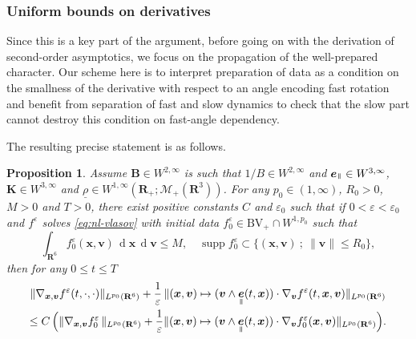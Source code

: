 \documentclass[JEP,XML,SOM,Unicode]{cedram}
\let\mathcal\mathscr
\newcommand{\sep}{\ ;\ }
\newcommand{\BV}{\mathrm{BV}}
\let\eps\varepsilon
\DeclareMathOperator\dD{d}\let\dd\dD
\theoremstyle{plain}
\newtheorem{proposition}[theorem]{Proposition}
\theoremstyle{definition}
\newcommand{\bpr}{\begin{proposition}}
\newcommand{\epr}{\end{proposition}}
\newcommand\R{\mathbf R}
\newcommand\bB{{\boldsymbol B}}
\newcommand\bK{{\boldsymbol K}}
\newcommand\bfv{{\boldsymbol v}}
\newcommand\bfx{{\boldsymbol x}}
\newcommand\urho{{\underline \rho}}
\newcommand\cM{{\mathcal M}}
\DeclareMathOperator{\beD}{\boldsymbol{e}}
\newcommand\eDpar{\beD_\mypar}
\newcommand{\mypar}{{\mkern3mu\vphantom{\perp}\vrule depth 0pt\mkern2mu\vrule depth 0pt\mkern3mu}}
\begin{document}
\subsubsection{Uniform bounds on derivatives}

Since this is a key part of the argument, before going on with the derivation of second-order asymptotics, we focus on the propagation of the well-prepared character. Our scheme here is to interpret preparation of data as a condition on the smallness of the derivative with respect to an angle encoding fast rotation and benefit from separation of fast and slow dynamics to check that the slow part cannot destroy this condition on fast-angle dependency.

The resulting precise statement is as follows.

\bpr\label{p:bd-nl}
Assume $\bB\in W^{2,\infty}$ is such that $1/B\in W^{2,\infty}$ and $\eDpar\in W^{3,\infty}$, $\bK\in W^{3,\infty}$ and $\urho\in W^{1,\infty}(\R_+;\cM_+(\R^3))$. For any $p_0\in(1,\infty)$, $R_0>0$, $M>0$ and $T>0$, there exist positive constants $C$ and $\eps_0$ such that if $0<\eps<\eps_0$ and $f^\eps$ solves \eqref{eq:nl-vlasov} with initial data $f_0^\eps\in \BV_+\cap W^{1,p_0}$ such that
\[
\int_{\R^6}f_0^\eps(\bfx,\bfv)\,\dD \bfx\,\dD \bfv\leq M,\quad
\operatorname{supp}f_0^\eps\subset
\{(\bfx,\bfv)\sep \|\bfv\|\leq R_0\},
\]
then for any $0\leq t\leq T$
\begin{multline*}
\|\nabla_{\bfx,\bfv}f^\eps(t,\cdot,\cdot)\|_{L^{p_0}(\R^6)}
+\frac{1}{\eps}\,\|(\bfx,\bfv)\mapsto (\bfv\wedge\eDpar(t,\bfx))\cdot\nabla_{\bfv}f^\eps(t,\bfx,\bfv)\|_{L^{p_0}(\R^6)}\\
\leq
C\,\Bigl(
\|\nabla_{\bfx,\bfv}f_0^\eps\,\|_{L^{p_0}(\R^6)}
+\frac{1}{\eps}\|(\bfx,\bfv)\mapsto (\bfv\wedge\eDpar(t,\bfx))\cdot\nabla_{\bfv}f_0^\eps(\bfx,\bfv)\|_{L^{p_0}(\R^6)}\Bigr).
\end{multline*}
\epr
\end{document}
